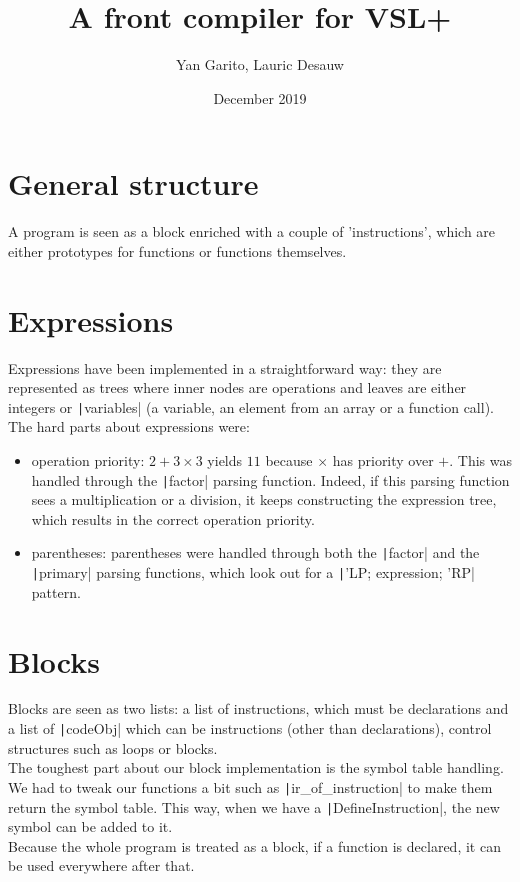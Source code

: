\documentclass{article}
\title{A front compiler for VSL+}
\author{Yan Garito, Lauric Desauw}
\date{December 2019}
\newcommand{\code}[1]{\texttt|#1|}
\begin{document}
\maketitle


\section{General structure}

A program is seen as a block enriched with a couple of 'instructions', which are either prototypes for functions or functions themselves.


\section{Expressions}

Expressions have been implemented in a straightforward way: they are represented as trees where inner nodes are operations and leaves are either integers or \code{variables} (a variable, an element from an array or a function call). \\
The hard parts about expressions were:
\begin{itemize}

\item operation priority: $2+3 \times 3$ yields $11$ because $\times$ has priority over $+$. This was handled through the \code{factor} parsing function. Indeed, if this parsing function sees a multiplication or a division, it keeps constructing the expression tree, which results in the correct operation priority.
\item parentheses: parentheses were handled through both the \code{factor} and the \code{primary} parsing functions, which look out for a \code{'LP; expression; 'RP} pattern. 
  
\end{itemize}
  
\section{Blocks}

Blocks are seen as two lists: a list of instructions, which must be declarations and a list of \code{codeObj} which can be instructions (other than declarations), control structures such as loops or blocks. \\
The toughest part about our block implementation is the symbol table handling. We had to tweak our functions a bit such as \code{ir_of_instruction} to make them return the symbol table. This way, when we have a \code{DefineInstruction}, the new symbol can be added to it. \\
Because the whole program is treated as a block, if a function is declared, it can be used everywhere after that. 
\end{document}

